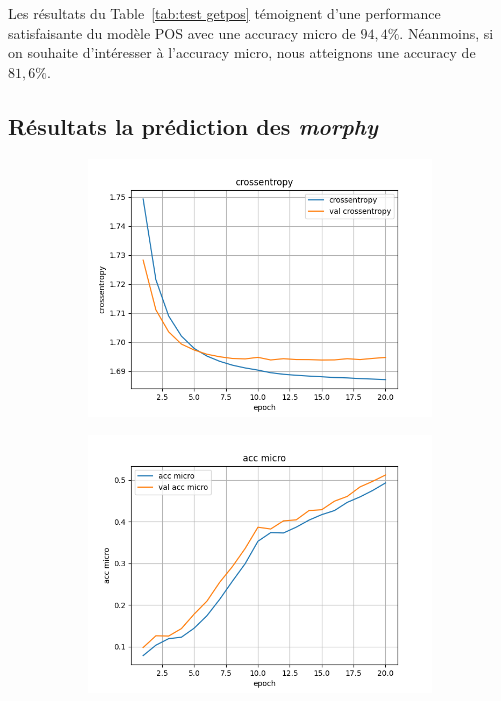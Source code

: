 \documentclass[a4paper]{article}
\begin{document}
Les résultats du Table~\ref{tab:test getpos} témoignent d'une performance satisfaisante du modèle POS avec une accuracy micro 
de $94,4\%$. Néanmoins, si on souhaite d'intéresser à l'accuracy micro, nous atteignons une accuracy de $81,6\%$.

\subsection{Résultats la prédiction des \textit{morphy}}

\begin{figure}[H]
    \centering
    \begin{subfigure}{0.32\textwidth}
        \centering
        \includegraphics[width=\linewidth]{../logs/supertag/crossentropy.png}
    \end{subfigure}
    \begin{subfigure}{0.32\textwidth}
        \centering
        \includegraphics[width=\linewidth]{../logs/supertag/acc micro.png}

\end{subfigure}
\end{figure}
\end{document}
